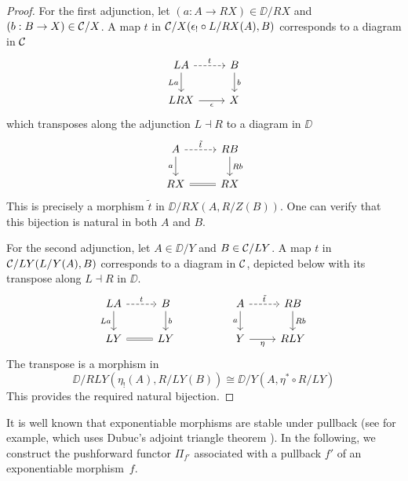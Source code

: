\begin{proof}
  For the first adjunction,
  let $(a : A \to R X) \in \DD / R X$ and $(b : B \to X) \in \mathcal{C} / X$.
  A map $t$ in $\mathcal{C} / X (\epsilon_! \circ L / R X (A), B)$
  corresponds to a diagram in $\mathcal{C}$
  \[ \begin{tikzcd}
    {L A} & B \\
    {L R X} & X
    \arrow["t", dashed, from=1-1, to=1-2]
    \arrow["{L a}"', from=1-1, to=2-1]
    \arrow["b", from=1-2, to=2-2]
    \arrow["\epsilon"', from=2-1, to=2-2]
  \end{tikzcd} \]
  which transposes along the adjunction $L \dashv R$
  to a diagram in $\DD$
  \[ \begin{tikzcd}
    A & RB \\
    {R X} & {R X}
    \arrow["{\tilde{t}}", dashed, from=1-1, to=1-2]
    \arrow["a"', from=1-1, to=2-1]
    \arrow["Rb", from=1-2, to=2-2]
    \arrow[equals, from=2-1, to=2-2]
  \end{tikzcd} \]
  This is precisely a morphism
  $\tilde{t}$ in $\DD / R X (A, R / Z (B))$.
  One can verify that this bijection is natural in both $A$ and $B$.
  
  For the second adjunction,
  let $A \in \DD / Y$ and $B \in \mathcal{C} / L Y$.
  A map $t$ in $\mathcal{C} / L Y (L / Y (A), B)$
  corresponds to a diagram in $\mathcal{C}$,
  depicted below with its transpose along $L \dashv R$ in $\DD$.
  \[ \begin{tikzcd}
    {L A} & B && A & RB \\
    {L Y} & {L Y} && Y & {R L Y}
    \arrow["t", dashed, from=1-1, to=1-2]
    \arrow["{L a}"', from=1-1, to=2-1]
    \arrow["b", from=1-2, to=2-2]
    \arrow["{\tilde{t}}", dashed, from=1-4, to=1-5]
    \arrow["a"', from=1-4, to=2-4]
    \arrow["Rb", from=1-5, to=2-5]
    \arrow[equals, from=2-1, to=2-2]
    \arrow["\eta"', from=2-4, to=2-5]
  \end{tikzcd} \]
  The transpose is a morphism in
  \[\DD / R L Y (\eta_! (A), R / L Y (B)) \cong \DD / Y (A, \eta^* \circ R / L Y)\]
  This provides the required natural bijection.
\end{proof}

It is well known that
exponentiable morphisms are stable under pullback 
(see \cite[Section 2.1]{weber2015} for example,
which uses Dubuc's adjoint triangle theorem \cite{dubuc2006}).
In the following,
we construct the pushforward functor $\Pi_{f'}$ associated
with a pullback $f'$ of an exponentiable morphism~$f$.


